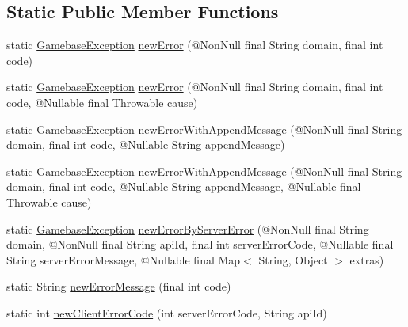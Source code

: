 \subsection*{Static Public Member Functions}
\begin{DoxyCompactItemize}
\item 
static \hyperlink{classcom_1_1toast_1_1android_1_1gamebase_1_1base_1_1_gamebase_exception}{Gamebase\+Exception} \hyperlink{classcom_1_1toast_1_1android_1_1gamebase_1_1base_1_1_gamebase_error_a2d1d7646a1658d188ee9b65a25905661}{new\+Error} (@Non\+Null final String domain, final int code)
\item 
static \hyperlink{classcom_1_1toast_1_1android_1_1gamebase_1_1base_1_1_gamebase_exception}{Gamebase\+Exception} \hyperlink{classcom_1_1toast_1_1android_1_1gamebase_1_1base_1_1_gamebase_error_a65b209f183118b929f313eedbadcfc71}{new\+Error} (@Non\+Null final String domain, final int code, @Nullable final Throwable cause)
\item 
static \hyperlink{classcom_1_1toast_1_1android_1_1gamebase_1_1base_1_1_gamebase_exception}{Gamebase\+Exception} \hyperlink{classcom_1_1toast_1_1android_1_1gamebase_1_1base_1_1_gamebase_error_a2ed49c27d7a237cd7fcdaa43604c9615}{new\+Error\+With\+Append\+Message} (@Non\+Null final String domain, final int code, @Nullable String append\+Message)
\item 
static \hyperlink{classcom_1_1toast_1_1android_1_1gamebase_1_1base_1_1_gamebase_exception}{Gamebase\+Exception} \hyperlink{classcom_1_1toast_1_1android_1_1gamebase_1_1base_1_1_gamebase_error_a6aa42722f0af25a63811f924fd940552}{new\+Error\+With\+Append\+Message} (@Non\+Null final String domain, final int code, @Nullable String append\+Message, @Nullable final Throwable cause)
\item 
static \hyperlink{classcom_1_1toast_1_1android_1_1gamebase_1_1base_1_1_gamebase_exception}{Gamebase\+Exception} \hyperlink{classcom_1_1toast_1_1android_1_1gamebase_1_1base_1_1_gamebase_error_af6a27716a44f247527608e14098bb01b}{new\+Error\+By\+Server\+Error} (@Non\+Null final String domain, @Non\+Null final String api\+Id, final int server\+Error\+Code, @Nullable final String server\+Error\+Message, @Nullable final Map$<$ String, Object $>$ extras)
\item 
static String \hyperlink{classcom_1_1toast_1_1android_1_1gamebase_1_1base_1_1_gamebase_error_a42ebfd14c26b172ab5e528b94647e9e2}{new\+Error\+Message} (final int code)
\item 
static int \hyperlink{classcom_1_1toast_1_1android_1_1gamebase_1_1base_1_1_gamebase_error_ae1e31671405d6d3c4660aacf9d9dd3c5}{new\+Client\+Error\+Code} (int server\+Error\+Code, String api\+Id)
\end{DoxyCompactItemize}
